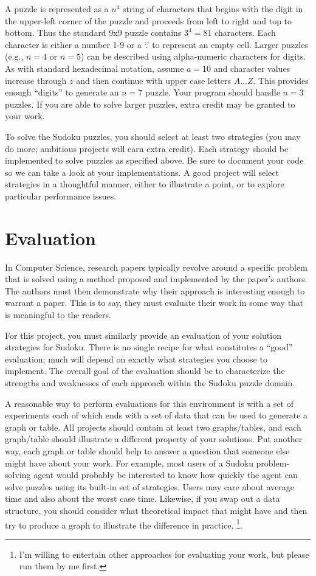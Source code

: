 \documentclass[letterpaper]{article}
\begin{document}
A puzzle is represented as a $n^4$ string of characters that begins
with the digit in the upper-left corner of the puzzle and proceeds
from left to right and top to bottom. Thus the standard 9x9 puzzle
contains $3^{4}=81$ characters. Each character is either a number 1-9
or a `.' to represent an empty cell.  Larger puzzles (e.g.,
$n=4$ or $n=5$) can be described using alpha-numeric characters for
digits. As with standard hexadecimal notation, assume $a=10$ and
character values increase through $z$ and then continue with upper
case letters $A \dots Z$. This provides enough ``digits'' to generate
an $n=7$ puzzle. Your program should handle $n=3$ puzzles.
If you are able to solve larger puzzles, extra credit may be granted to your work.

To solve the Sudoku puzzles, you should select at least two strategies
(you may do more; ambitious projects
will earn extra credit). Each strategy should be implemented to solve
puzzles as specified above. Be sure to document your code so we can
take a look at your implementations. A good project will select
strategies in a thoughtful manner, either to illustrate a point, or to
explore particular performance issues.

\section{Evaluation}

In Computer Science, research papers typically revolve around a
specific problem that is solved using a method proposed and
implemented by the paper's authors. The authors must then demonstrate
why their approach is interesting enough to warrant a paper. This is
to say, they must evaluate their work in some way that is meaningful
to the readers.

For this project, you must similarly provide an evaluation of your
solution strategies for Sudoku.  There is no single recipe for what
constitutes a ``good'' evaluation; much will depend on exactly what
strategies you choose to implement. The overall goal of the evaluation
should be to characterize the strengths and weaknesses of each
approach within the Sudoku puzzle domain.

A reasonable way to perform evaluations for this environment is with a
set of experiments each of which ends with a set of data that can be
used to generate a graph or table. All projects should contain at least
two graphs/tables, and each graph/table should illustrate
a different property of your solutions. Put another way, each graph or table should help to
answer a question that someone else might have about your work.  For example, most
users of a Sudoku problem-solving agent would probably be interested
to know how quickly the agent can solve puzzles using its built-in set
of strategies.  Users may care about average time and also about the worst
case time. Likewise, if you swap out a data structure, you should
consider what theoretical impact that might have and then try to
produce a graph to illustrate the difference in
practice. \footnote{I'm willing to entertain other approaches for
  evaluating your work, but
  please run them by me first.}.
\end{document}
